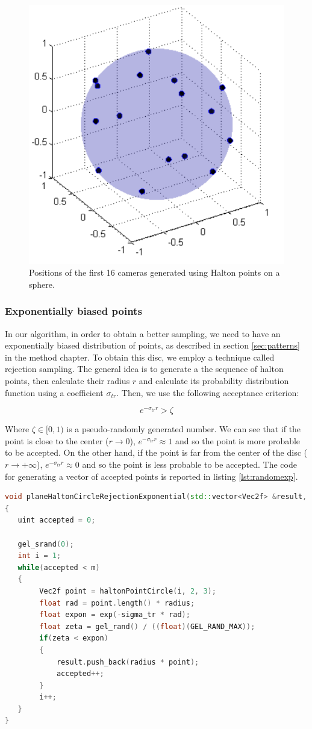 \begin{figure}[!ht]
\centering
\includegraphics[width=0.5\linewidth]{images/matlab/cameras.pdf}
\caption{Positions of the first 16 cameras generated using Halton points on a sphere.}
\label{fig:cameras}
\end{figure} 

\subsubsection{Exponentially biased points}
\label{sec:exponentiallybiased}
In our algorithm, in order to obtain a better sampling, we need to have an exponentially biased distribution of points, as described in section \ref{sec:patterns} in the method chapter. To obtain this disc, we employ a technique called rejection sampling. The general idea is to generate a the sequence of halton points, then calculate their radius $r$ and calculate its probability distribution function using a coefficient $\sigma_{tr}$. Then, we use the following acceptance criterion:

$$
e^{-\sigma_{tr} r} > \zeta
$$

Where $\zeta \in [0,1)$ is a pseudo-randomly generated number. We can see that if the point is close to the center ($r \rightarrow 0$), $e^{-\sigma_{tr} r} \approx 1$ and so the point is more probable to be accepted. On the other hand, if the point is far from the center of the disc ($r \rightarrow +\infty$), $e^{-\sigma_{tr} r} \approx 0$ and so the point is less probable to be accepted. The code for generating a vector of accepted points is reported in listing \ref{lst:randomexp}.

\begin{lstlisting}[language=C++,label=lst:randomexp,caption={Generation by rejection of a exponentially distributed disc. The function generates $M$ points with distribution $e^{-\sigma_{tr} r}$, and where \gl{radius} is the maximum final radius of the points.}]
void planeHaltonCircleRejectionExponential(std::vector<Vec2f> &result, int m, float sigma_tr, float radius)
{
   uint accepted = 0;

   gel_srand(0);
   int i = 1;
   while(accepted < m)
   {
        Vec2f point = haltonPointCircle(i, 2, 3);
        float rad = point.length() * radius;
        float expon = exp(-sigma_tr * rad);
        float zeta = gel_rand() / ((float)(GEL_RAND_MAX));
        if(zeta < expon)
        {
            result.push_back(radius * point);
            accepted++;
        }
        i++;
   }
}
\end{lstlisting}

